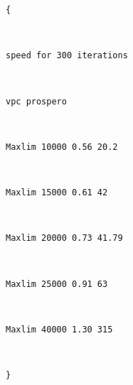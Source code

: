\documentclass[10pt, a4paper]{article}
\begin{document}
\begin{tabbing}
\parbox{14cm}{\texttt{\small{\{}}}\\
\parbox{14cm}{\texttt{\small{speed for 300 iterations}}}\\
\parbox{14cm}{\texttt{\small{vpc        prospero}}}\\
\parbox{14cm}{\texttt{\small{Maxlim 10000        0.56           20.2}}}\\
\parbox{14cm}{\texttt{\small{Maxlim 15000        0.61           42}}}\\
\parbox{14cm}{\texttt{\small{Maxlim 20000        0.73           41.79}}}\\
\parbox{14cm}{\texttt{\small{Maxlim 25000        0.91           63}}}\\
\parbox{14cm}{\texttt{\small{Maxlim 40000        1.30           315}}}\\
\parbox{14cm}{\texttt{\small{\}}}}\\
\end{tabbing}
\end{document}

